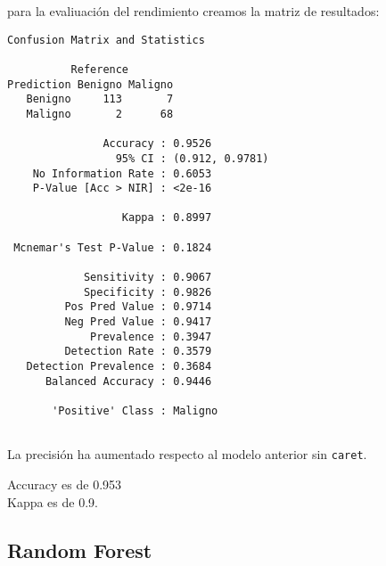 \documentclass[
]{article}
\newenvironment{Shaded}{\begin{snugshade}}{\end{snugshade}}
\newcommand{\CommentTok}[1]{\textcolor[rgb]{0.56,0.35,0.01}{\textit{#1}}}
\newcommand{\DataTypeTok}[1]{\textcolor[rgb]{0.13,0.29,0.53}{#1}}
\newcommand{\FloatTok}[1]{\textcolor[rgb]{0.00,0.00,0.81}{#1}}
\newcommand{\KeywordTok}[1]{\textcolor[rgb]{0.13,0.29,0.53}{\textbf{#1}}}
\newcommand{\NormalTok}[1]{#1}
\newcommand{\OperatorTok}[1]{\textcolor[rgb]{0.81,0.36,0.00}{\textbf{#1}}}
\newcommand{\StringTok}[1]{\textcolor[rgb]{0.31,0.60,0.02}{#1}}
\begin{document}
para la evaliuación del rendimiento creamos la matriz de resultados:

\begin{Shaded}
\end{Shaded}

\begin{verbatim}
Confusion Matrix and Statistics

          Reference
Prediction Benigno Maligno
   Benigno     113       7
   Maligno       2      68
                                         
               Accuracy : 0.9526         
                 95% CI : (0.912, 0.9781)
    No Information Rate : 0.6053         
    P-Value [Acc > NIR] : <2e-16         
                                         
                  Kappa : 0.8997         
                                         
 Mcnemar's Test P-Value : 0.1824         
                                         
            Sensitivity : 0.9067         
            Specificity : 0.9826         
         Pos Pred Value : 0.9714         
         Neg Pred Value : 0.9417         
             Prevalence : 0.3947         
         Detection Rate : 0.3579         
   Detection Prevalence : 0.3684         
      Balanced Accuracy : 0.9446         
                                         
       'Positive' Class : Maligno        
                                         
\end{verbatim}

La precisión ha aumentado respecto al modelo anterior sin
\texttt{caret}.

Accuracy es de 0.953\\
Kappa es de 0.9.

\hypertarget{random-forest}{%
\subsection{Random Forest}\label{random-forest}}
\end{document}
